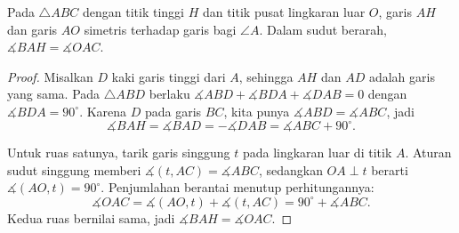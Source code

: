 \documentclass[letterpaper, 13pt]{scrartcl}
\newcommand{\titik}[1]{\foreach \p in {#1} \filldraw (\p) circle (1.4pt);}
\begin{document}
\noindent
\begin{minipage}[t]{175pt}
\vspace{0pt}
\centering
{}
\end{minipage}\hfill
\begin{minipage}[t]{\dimexpr\textwidth-175pt-16pt\relax}
\vspace{0pt}
\begin{theorem*}
Pada $\triangle ABC$ dengan titik tinggi $H$ dan titik pusat lingkaran luar $O$, garis $AH$ dan garis $AO$ simetris terhadap garis bagi $\angle A$. Dalam sudut berarah, $\measuredangle BAH = \measuredangle OAC$.
\end{theorem*}
\end{minipage}
\par\bigskip


\begin{proof}
Misalkan $D$ kaki garis tinggi dari $A$, sehingga $AH$ dan $AD$ adalah garis yang sama. Pada $\triangle ABD$ berlaku $\measuredangle ABD + \measuredangle BDA + \measuredangle DAB = 0$ dengan $\measuredangle BDA = 90^\circ$. Karena $D$ pada garis $BC$, kita punya $\measuredangle ABD = \measuredangle ABC$, jadi
\[
\measuredangle BAH = \measuredangle BAD = -\measuredangle DAB = \measuredangle ABC + 90^\circ.
\]

Untuk ruas satunya, tarik garis singgung $t$ pada lingkaran luar di titik $A$. Aturan sudut singgung memberi $\measuredangle(t, AC) = \measuredangle ABC$, sedangkan $OA \perp t$ berarti $\measuredangle(AO, t) = 90^\circ$. Penjumlahan berantai menutup perhitungannya:
\[
\measuredangle OAC = \measuredangle(AO, t) + \measuredangle(t, AC) = 90^\circ + \measuredangle ABC.
\]
Kedua ruas bernilai sama, jadi $\measuredangle BAH = \measuredangle OAC$.
\end{proof}
\end{document}
